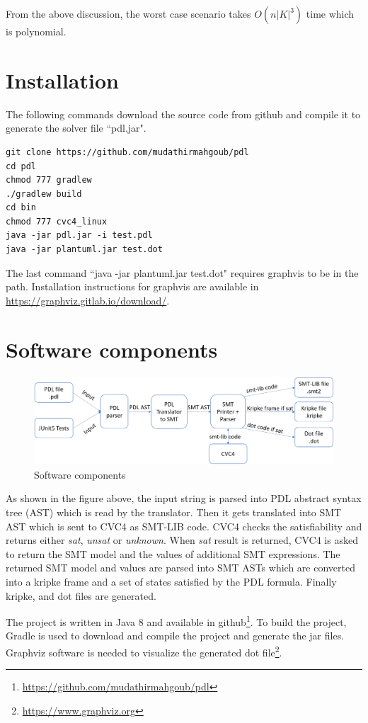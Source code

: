 \documentclass[12pt,a4paper]{article}
\begin{document}
From the above discussion, the worst case scenario takes $O(n \vert K \vert ^3)$ time which is polynomial. 

\section{Installation}

The following commands download the source code from github and compile it to generate the solver file ``pdl.jar". 

\begin{verbatim}
git clone https://github.com/mudathirmahgoub/pdl
cd pdl
chmod 777 gradlew
./gradlew build
cd bin
chmod 777 cvc4_linux
java -jar pdl.jar -i test.pdl 
java -jar plantuml.jar test.dot
\end{verbatim}

The last command ``java -jar plantuml.jar test.dot" requires graphvis to be in the path. Installation instructions for graphvis are available in \url{https://graphviz.gitlab.io/download/}. 

\section{Software components}
\begin{figure}[H]
\center
\includegraphics[scale=0.35]{solver.png}
\caption{Software components}
\end{figure}

As shown in the figure above, the input string is parsed into PDL abstract syntax tree (AST) which is read by the translator. Then it gets translated into SMT AST which is sent to CVC4 as SMT-LIB code. CVC4 checks the satisfiability and returns either \textit{sat}, \textit{unsat} or \textit{unknown}. When \textit{sat} result is returned, CVC4 is asked to return the SMT model and the values of additional SMT expressions. The returned SMT model and values are parsed into SMT ASTs which are converted into a kripke frame and a set of states satisfied by the PDL formula. Finally kripke, and dot files are generated. 

The project is written in Java 8 and available in github\footnote{\url{https://github.com/mudathirmahgoub/pdl}}. To build the project, Gradle is used to download and compile the project and generate the jar files. Graphviz software is needed to visualize the generated dot file\footnote{\url{https://www.graphviz.org}}. 
\end{document}

